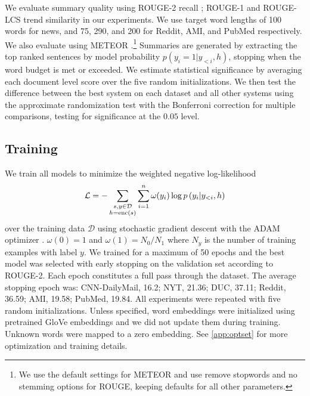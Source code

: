 
We evaluate summary quality using ROUGE-2 recall \cite{lin2004rouge};
ROUGE-1 and ROUGE-LCS trend similarity in our experiments.
We use target word lengths of 100 words for news, and 
75, 290, and 200 for Reddit, AMI, and PubMed respectively.
We also evaluate using METEOR \cite{denkowski:lavie:meteor-wmt:2014}.\footnote{We use the default settings for METEOR and use remove stopwords and no stemming options for ROUGE, keeping defaults for all other parameters.}
Summaries are generated by extracting the top ranked sentences by model probability $p(y_i=1|y_{<i},h)$, stopping when the word budget is met or exceeded.
We estimate statistical significance by averaging each document level score
over the five random initializations. 
We then test the difference between the best system on each dataset and 
all other systems using the approximate randomization test 
\cite{riezler2005some} with the Bonferroni correction for multiple comparisons,
testing for significance at the $0.05$ level. 

\subsection{Training}

We train all models to minimize the weighted negative log-likelihood
\[\mathcal{L} = -\sum_{\substack{ s,y\in \mathcal{D} \\ h = \operatorname{enc}(s) } } \sum_{i=1}^{n} \omega(y_i) \log p\left(y_i|y_{<i},
h \right)\]
over the training data $\mathcal{D}$
using stochastic gradient descent with the ADAM optimizer
\cite{kingma2014adam}.
$\omega(0)=1$ and $\omega(1) = N_0/N_1$ where $N_y$ is the number of 
training examples with label $y$.
    We trained for a maximum of 50 epochs and the best
    model was selected with early stopping on the validation set according
    to ROUGE-2. Each epoch constitutes a full pass through the
    dataset. The average stopping epoch was: CNN-DailyMail, 16.2; NYT, 21.36; DUC, 37.11; Reddit, 36.59; AMI, 19.58; PubMed, 19.84.
     All experiments were repeated with five random
    initializations.     Unless specified, word embeddings were initialized 
    using pretrained GloVe embeddings \cite{pennington2014glove} and we did 
    not update them during training. Unknown words were mapped to a zero 
    embedding.
    See \autoref{app:optset} for more optimization and training details.

